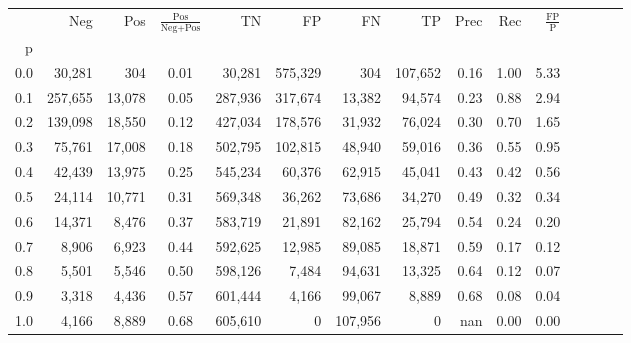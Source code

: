 \begin{tabular}{rrrcrrrrrrrrrrr}
\toprule
{} &      Neg &     Pos & $\frac{\text{Pos}}{\text{Neg}+\text{Pos}}$ &       TN &       FP &       FN &       TP &  Prec &   Rec & $\frac{\text{FP}}{\text{P}}$ \\
p   &          &         &                                            &          &          &          &          &       &       &                              \\
\midrule
0.0 &   30,281 &     304 &                                       0.01 &   30,281 &  575,329 &      304 &  107,652 &  0.16 &  1.00 &                         5.33 \\
0.1 &  257,655 &  13,078 &                                       0.05 &  287,936 &  317,674 &   13,382 &   94,574 &  0.23 &  0.88 &                         2.94 \\
0.2 &  139,098 &  18,550 &                                       0.12 &  427,034 &  178,576 &   31,932 &   76,024 &  0.30 &  0.70 &                         1.65 \\
0.3 &   75,761 &  17,008 &                                       0.18 &  502,795 &  102,815 &   48,940 &   59,016 &  0.36 &  0.55 &                         0.95 \\
0.4 &   42,439 &  13,975 &                                       0.25 &  545,234 &   60,376 &   62,915 &   45,041 &  0.43 &  0.42 &                         0.56 \\
0.5 &   24,114 &  10,771 &                                       0.31 &  569,348 &   36,262 &   73,686 &   34,270 &  0.49 &  0.32 &                         0.34 \\
0.6 &   14,371 &   8,476 &                                       0.37 &  583,719 &   21,891 &   82,162 &   25,794 &  0.54 &  0.24 &                         0.20 \\
0.7 &    8,906 &   6,923 &                                       0.44 &  592,625 &   12,985 &   89,085 &   18,871 &  0.59 &  0.17 &                         0.12 \\
0.8 &    5,501 &   5,546 &                                       0.50 &  598,126 &    7,484 &   94,631 &   13,325 &  0.64 &  0.12 &                         0.07 \\
0.9 &    3,318 &   4,436 &                                       0.57 &  601,444 &    4,166 &   99,067 &    8,889 &  0.68 &  0.08 &                         0.04 \\
1.0 &    4,166 &   8,889 &                                       0.68 &  605,610 &        0 &  107,956 &        0 &   nan &  0.00 &                         0.00 \\
\bottomrule
\end{tabular}
